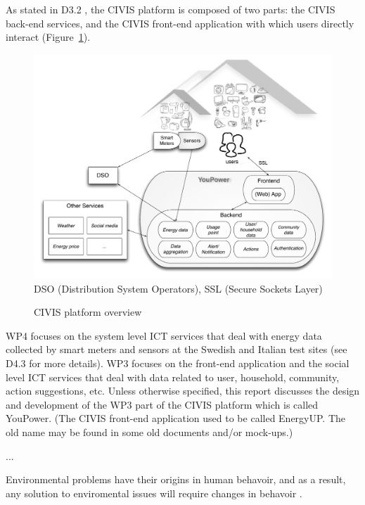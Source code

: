 As stated in D3.2 \citep{Huang2015c}, the CIVIS platform is composed of two parts: the CIVIS back-end services, and the CIVIS front-end application with which users directly interact (Figure~\ref{fig:platform}). 
%
\begin{figure}
\begin{center}\footnotesize
	\includegraphics[width=.95\textwidth]{img/civis_platform_overview.pdf}\\
	DSO (Distribution System Operators),  SSL (Secure Sockets Layer)
	\caption{CIVIS platform overview}\label{fig:platform}
\end{center}
\end{figure}
% 
WP4 focuses on the system level ICT services that deal with energy data collected by smart meters and sensors at the Swedish and Italian test sites (see D4.3 for more details). 
WP3 focuses on the front-end application and the social level ICT services that deal with data related to user, household, community, action suggestions, etc. Unless otherwise specified, this report discusses the design and development of the WP3 part of the CIVIS platform which is called YouPower. (The CIVIS front-end application used to be called EnergyUP. The old name may be found in some old documents and/or mock-ups.)

... 

Environmental problems have their origins in human behavoir, and as a result, any solution to enviromental issues will require changes in behavoir 
\citep{Schultz2014}.

